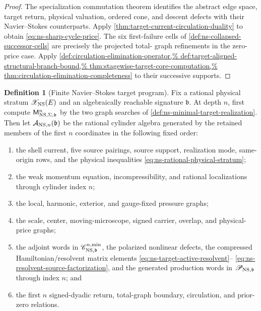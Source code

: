\documentclass[11pt]{article}
\numberwithin{section}{part}
\theoremstyle{plain}
\theoremstyle{definition}
\newtheorem{definition}[definition]{Definition}
\theoremstyle{remark}
\begin{document}
\begin{proof}
The specialization commutation theorem identifies the abstract edge space,
target return, physical valuation, ordered cone, and descent defects with
their Navier--Stokes counterparts.  Apply
\cref{thm:target-current-circulation-duality} to obtain
\eqref{eq:ns-sharp-cycle-price}.  The six first-failure cells of
\cref{def:ns-collapsed-successor-cells} are precisely the projected total-
graph refinements in the zero-price case.  Apply
\cref{def:circulation-elimination-operator,%
def:target-aligned-structural-branch-bound,%
thm:stagewise-target-core-computation,%
thm:circulation-elimination-completeness} to their successive supports.
\end{proof}

\begin{definition}[Finite Navier--Stokes target program]
\label{def:ns-finite-target-program}
Fix a rational physical stratum \(\mathscr X_{\rm NS}(E)\) and an
algebraically reachable signature \(\mathfrak b\).  At depth \(n\),
first compute \(\mathsf M^n_{{\rm NS},\Sigma,\mathfrak b}\) by the two graph
searches of \cref{def:ns-minimal-target-realization}.  Then
let \(\mathcal A_{{\rm NS},n}(\mathfrak b)\) be the rational cylinder algebra
generated by the retained members of the first \(n\) coordinates in the
following fixed order:
\begin{enumerate}[label=\textup{(T\arabic*)}]
\item the shell current, five source pairings, source support, realization
mode, same-origin rows, and the physical inequalities
\eqref{eq:ns-rational-physical-stratum};
\item the weak momentum equation, incompressibility, and rational
localizations through cylinder index \(n\);
\item the local, harmonic, exterior, and gauge-fixed pressure graphs;
\item the scale, center, moving-microscope, signed carrier, overlap, and
physical-price graphs;
\item the adjoint words in
\(\mathscr C^{n,\min}_{{\rm NS},\mathfrak b}\), the polarized nonlinear defects,
the compressed Hamiltonian/resolvent matrix elements
\eqref{eq:ns-target-active-resolvent}--
\eqref{eq:ns-resolvent-source-factorization}, and the generated production words in
\(\mathscr P_{{\rm NS},\mathfrak b}\) through index \(n\); and
\item the first \(n\) signed-dyadic return, total-graph boundary, circulation,
and prior-zero relations.
\end{enumerate}

\end{definition}
\end{document}
